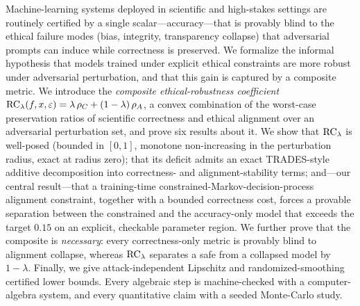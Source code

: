 Machine-learning systems deployed in scientific and high-stakes settings are
routinely certified by a single scalar---accuracy---that is provably blind to the
ethical failure modes (bias, integrity, transparency collapse) that adversarial
prompts can induce while correctness is preserved. We formalize the informal
hypothesis that models trained under explicit ethical constraints are more robust
under adversarial perturbation, and that this gain is captured by a composite
metric. We introduce the \emph{composite ethical-robustness coefficient}
$\mathrm{RC}_\lambda(f,x,\varepsilon)=\lambda\,\rho_C+(1-\lambda)\,\rho_A$, a convex
combination of the worst-case preservation ratios of scientific correctness and
ethical alignment over an adversarial perturbation set, and prove six results
about it. We show that $\mathrm{RC}_\lambda$ is well-posed (bounded in $[0,1]$, monotone
non-increasing in the perturbation radius, exact at radius zero); that its deficit
admits an exact TRADES-style additive decomposition into correctness- and
alignment-stability terms; and---our central result---that a training-time
constrained-Markov-decision-process alignment constraint, together with a bounded
correctness cost, forces a provable separation between the constrained and the
accuracy-only model that exceeds the target $0.15$ on an explicit, checkable
parameter region. We further prove that the composite is \emph{necessary}: every
correctness-only metric is provably blind to alignment collapse, whereas
$\mathrm{RC}_\lambda$ separates a safe from a collapsed model by $1-\lambda$. Finally, we
give attack-independent Lipschitz and randomized-smoothing certified lower bounds.
Every algebraic step is machine-checked with a computer-algebra system, and every
quantitative claim with a seeded Monte-Carlo study.
